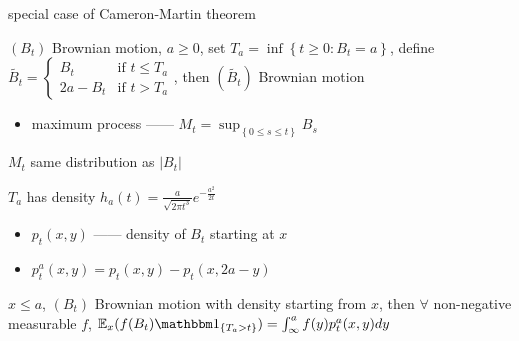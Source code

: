 \begin{fact}
    special case of Cameron-Martin theorem
\end{fact}

\begin{prop}
    $(B_t)$ Brownian motion, $a \geq 0$, set $T_a = \inf \left\{ t \geq 0 : B_t = a \right\}$, define $\tilde{B_t} = \begin{cases}
                                                                                                                         B_t & \text{if }t \leq T_a\\
                                                                                                                         2a - B_t & \text{if }t > T_a
    \end{cases}$, then $(\tilde{B_t})$ Brownian motion
\end{prop}

\begin{itemize}
    \item maximum process ------ $M_t = \sup_{\left\{ 0 \leq s \leq t \right\}} B_s$
\end{itemize}

\begin{fact}
    $M_t$ same distribution as $|B_t|$
\end{fact}

\begin{prop}
    $T_a$ has density $h_a(t) = \frac{a}{\sqrt{2\pi t^3}}e^{-\frac{a^2}{2t}}$
\end{prop}

\begin{itemize}
    \item $p_t(x, y)$ ------ density of $B_t$ starting at $x$
    \item $p_t^a(x, y) = p_t(x, y) - p_t(x, 2a - y)$
\end{itemize}

\begin{prop}
    $x \leq a$, $(B_t)$ Brownian motion with density starting from $x$, then $\forall$ non-negative measurable $f$,
    $\Ex_x(f(B_t)\In_{\left\{ T_a > t \right\}}) = \int^a_\infty f(y)p_t^a(x, y)dy$
\end{prop}